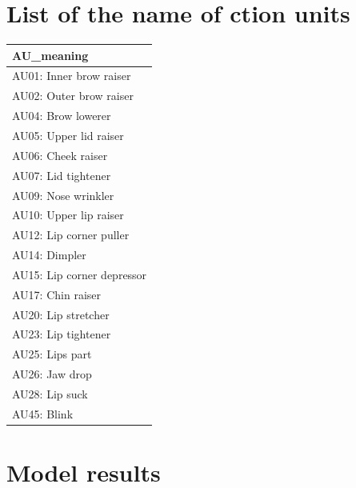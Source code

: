 \documentclass{monashthesis}
\begin{document}
\hypertarget{list-of-the-name-of-ction-units}{%
\section{List of the name of ction units}\label{list-of-the-name-of-ction-units}}

\begin{tabular}{l}
\hline
AU\_meaning\\
\hline
AU01: Inner brow raiser\\
\hline
AU02: Outer brow raiser\\
\hline
AU04: Brow lowerer\\
\hline
AU05: Upper lid raiser\\
\hline
AU06: Cheek raiser\\
\hline
AU07: Lid tightener\\
\hline
AU09: Nose wrinkler\\
\hline
AU10: Upper lip raiser\\
\hline
AU12: Lip corner puller\\
\hline
AU14: Dimpler\\
\hline
AU15: Lip corner depressor\\
\hline
AU17: Chin raiser\\
\hline
AU20: Lip stretcher\\
\hline
AU23: Lip tightener\\
\hline
AU25: Lips part\\
\hline
AU26: Jaw drop\\
\hline
AU28: Lip suck\\
\hline
AU45: Blink\\
\hline
\end{tabular}

\hypertarget{model-results}{%
\section{Model results}\label{model-results}}
\end{document}

